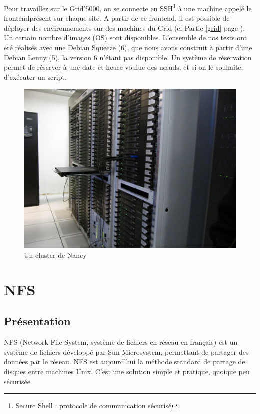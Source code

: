 \documentclass[12pt]{report}
\begin{document}
		Pour travailler sur le Grid'5000, on se connecte en SSH\footnote{Secure Shell : protocole de communication sécurisé} à une machine appelé le \og frontend\fg  présent sur chaque site.
		A partir de ce frontend, il est possible de déployer des environnements sur des machines du Grid (cf Partie \ref{grid} page \pageref{grid}).
		Un certain nombre d'images (OS) sont disponibles. L'ensemble de nos tests ont été réalisés avec une Debian Squeeze (6),
		que nous avons construit à partir d'une Debian Lenny (5), la version 6 n'étant pas disponible.
		Un système de réservation permet de réserver à une date et heure voulue des nœuds, et si on le souhaite,
		d'exécuter un script.

		\begin{figure}[H]
			\begin{center}
				\includegraphics[width=0.6\linewidth]{images/cluster_nancy.jpg}
				\caption{Un cluster de Nancy}
			\end{center}
		\end{figure}
		


	\chapter{NFS}
		\section{Présentation}

NFS (Network File System, système de fichiers en réseau en français) est un système de fichiers développé par Sun Microsystem, permettant de partager des données par le réseau. NFS est aujourd’hui la méthode standard de partage de disques entre machines Unix. 
		C’est une solution simple et pratique, quoique peu sécurisée.\\
		
\end{document}
